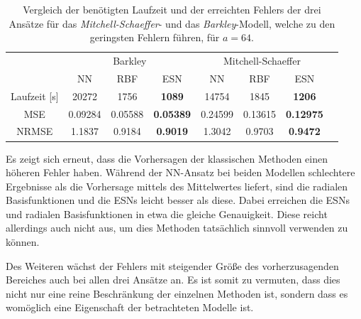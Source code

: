 \begin{table}[h]
	\centering
	\captionsetup{width=0.9\linewidth}
	\begin{tabular}{|c|c|c|c|c|c|c|c|}
		\multicolumn{1}{c|}{} & \multicolumn{3}{c|}{Barkley} & \multicolumn{3}{c|}{Mitchell-Schaeffer}		\\
		\cline{2-7}
		\multicolumn{1}{c|}{} & NN & RBF & ESN & NN & RBF & ESN \\
		
		\hline
		\hline
		
		Laufzeit [s] 	& 20272 	& 1756		& \textbf{1089}		& 14754		&  	1845	& \textbf{1206} \\
		\hline
		MSE 			& 0.09284	& 0.05588	& 	\textbf{0.05389} 		& 0.24599	& 0.13615 	& \textbf{0.12975}	 \\
		\hline
		NRMSE 			& 1.1837	& 0.9184	& \textbf{0.9019} 			& 1.3042	& 0.9703 	& \textbf{0.9472} \\
		\hline 
	\end{tabular} 
	\caption{Vergleich der benötigten Laufzeit und der erreichten Fehlers der drei Ansätze für das \textit{Mitchell-Schaeffer}- und das \textit{Barkley}-Modell, welche zu den geringsten Fehlern führen, für $a=64$.}
	\label{tab:exp_inner_cross_comparison_results}
\end{table}

Es zeigt sich erneut, dass die Vorhersagen der klassischen Methoden einen höheren Fehler haben. Während der \textsc{NN}-Ansatz bei beiden Modellen schlechtere Ergebnisse als die Vorhersage mittels des Mittelwertes liefert, sind die radialen Basisfunktionen und die \textsc{ESN}s leicht besser als diese. Dabei erreichen die \textsc{ESN}s und radialen Basisfunktionen in etwa die gleiche Genauigkeit. Diese reicht allerdings auch nicht aus, um dies Methoden tatsächlich sinnvoll verwenden zu können. 

Des Weiteren wächst der Fehlers mit steigender Größe des vorherzusagenden Bereiches auch bei allen drei Ansätze an. Es ist somit zu vermuten, dass dies nicht nur eine reine Beschränkung der einzelnen Methoden ist, sondern dass es womöglich eine Eigenschaft der betrachteten Modelle ist. 

